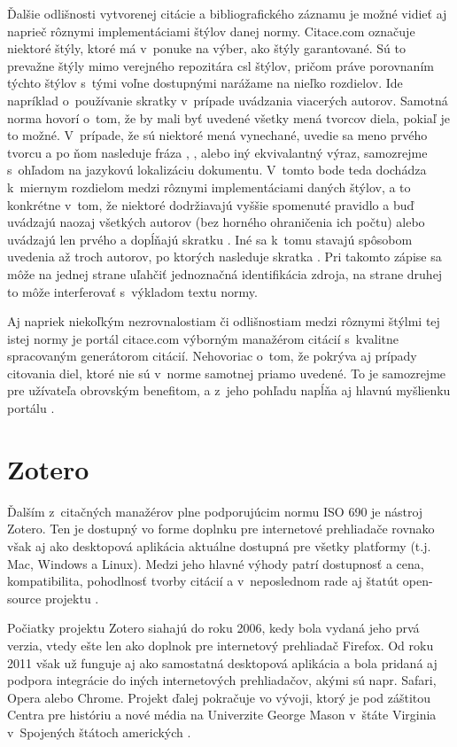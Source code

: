 \documentclass{fithesis3}
\begin{document}
	Ďalšie odlišnosti vytvorenej citácie a bibliografického záznamu je možné vidieť aj naprieč rôznymi implementáciami štýlov danej normy. Citace.com označuje niektoré štýly, ktoré má v~ponuke na výber, ako štýly garantované. Sú to prevažne štýly mimo verejného repozitára csl štýlov, pričom práve porovnaním týchto štýlov s~tými voľne dostupnými narážame na nieľko rozdielov. Ide napríklad o~používanie skratky  v~prípade uvádzania viacerých autorov. Samotná norma hovorí o~tom, že by mali byť uvedené všetky mená tvorcov diela, pokiaľ je to možné. V~prípade, že sú niektoré mená vynechané, uvedie sa meno prvého tvorcu a po ňom nasleduje fráza , ,  alebo iný ekvivalantný výraz, samozrejme s~ohľadom na jazykovú lokalizáciu dokumentu. V~tomto bode teda dochádza k~miernym rozdielom medzi rôznymi implementáciami daných štýlov, a to konkrétne v~tom, že niektoré dodržiavajú vyššie spomenuté pravidlo a buď uvádzajú naozaj všetkých autorov (bez horného ohraničenia ich počtu) alebo uvádzajú len prvého a dopĺňajú skratku . Iné sa k~tomu stavajú spôsobom uvedenia až troch autorov, po ktorých nasleduje skratka . Pri takomto zápise sa môže na jednej strane uľahčiť jednoznačná identifikácia zdroja, na strane druhej to môže interferovať s~výkladom textu normy.
	
	Aj napriek niekoľkým nezrovnalostiam či odlišnostiam medzi rôznymi štýlmi tej istej normy je portál citace.com výborným manažérom citácií s~kvalitne spracovaným generátorom citácií. Nehovoriac o~tom, že pokrýva aj prípady citovania diel, ktoré nie sú v~norme samotnej priamo uvedené. To je samozrejme pre užívateľa obrovským benefitom, a z~jeho pohľadu napĺňa aj hlavnú myšlienku portálu .
	
	\section{Zotero}
	Ďalším z~citačných manažérov plne podporujúcim normu ISO 690 je nástroj Zotero. Ten je dostupný vo forme doplnku pre internetové prehliadače rovnako však aj ako desktopová aplikácia aktuálne dostupná pre všetky platformy (t.j. Mac, Windows a Linux). Medzi jeho hlavné výhody patrí dostupnosť a cena, kompatibilita, pohodlnosť tvorby citácií a v~neposlednom rade aj štatút open-source projektu \cite[58--59]{Ansorge2013}.
	
	Počiatky projektu Zotero siahajú do roku 2006, kedy bola vydaná jeho prvá verzia, vtedy ešte len ako doplnok pre internetový prehliadač Firefox. Od roku 2011 však už funguje aj ako samostatná desktopová aplikácia a bola pridaná aj podpora integrácie do iných internetových prehliadačov, akými sú napr. Safari, Opera alebo Chrome. Projekt ďalej pokračuje vo vývoji, ktorý je pod záštitou Centra pre históriu a nové média na Univerzite George Mason v~štáte Virginia v~Spojených štátoch amerických \cite{Puckett2011}.
	
\end{document}
